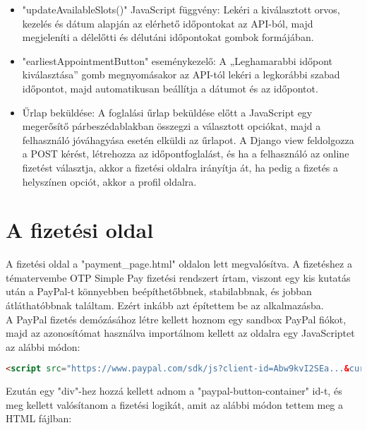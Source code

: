 \begin{itemize}
	\item "updateAvailableSlots()" JavaScript függvény:
	Lekéri a kiválasztott orvos, kezelés és dátum alapján az elérhető időpontokat az API-ból, majd megjeleníti a délelőtti és délutáni időpontokat gombok formájában.
	\item "earliestAppointmentButton" eseménykezelő:
	A „Leghamarabbi időpont kiválasztása” gomb megnyomásakor az API-tól lekéri a legkorábbi szabad időpontot, majd automatikusan beállítja a dátumot és az időpontot.
	\item Űrlap beküldése:
	A foglalási űrlap beküldése előtt a JavaScript egy megerősítő párbeszédablakban összegzi a választott opciókat, majd a felhasználó jóváhagyása esetén elküldi az űrlapot. A Django view feldolgozza a POST kérést, létrehozza az időpontfoglalást, és ha a felhasználó az online fizetést választja, akkor a fizetési oldalra irányítja át, ha pedig a fizetés a helyszínen opciót, akkor a profil oldalra.
\end{itemize}

\section{A fizetési oldal}

A fizetési oldal a "payment\_page.html" oldalon lett megvalósítva. A fizetéshez a tématervembe OTP Simple Pay fizetési rendszert írtam, viszont egy kis kutatás után a PayPal-t könnyebben beépíthetőbbnek, stabilabbnak, és jobban átláthatóbbnak találtam. Ezért inkább azt építettem be az alkalmazásba.\\
A PayPal fizetés demózásához létre kellett hoznom egy sandbox PayPal fiókot, majd az azonosítómat használva importálnom kellett az oldalra egy JavaScriptet az alábbi módon: 

\begin{lstlisting}[caption={A PayPal sandbox importja},label={lst:stringstartswith}, language={HTML}]
<script src="https://www.paypal.com/sdk/js?client-id=Abw9kvI2SEa...&currency=HUF"></script>
\end{lstlisting}

Ezután egy "div"-hez hozzá kellett adnom a "paypal-button-container" id-t, és meg kellett valósítanom a fizetési logikát, amit az alábbi módon tettem meg a HTML fájlban:
 	
